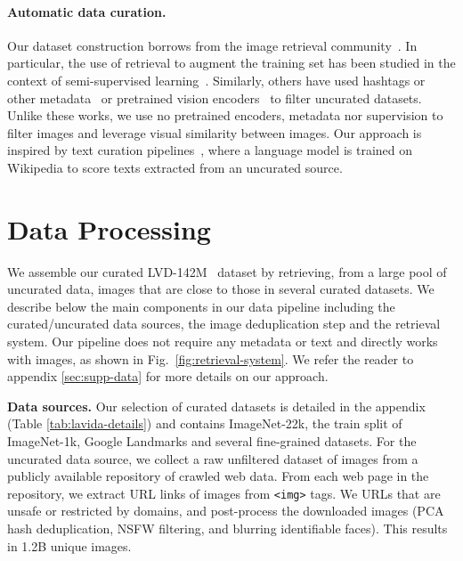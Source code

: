 \paragraph{Automatic data curation.} Our dataset construction borrows from the image retrieval community~\citep{weinzaepfel2021learning,radenovic2018fine,berman2019multigrain,douze2009evaluation,tolias2015particular,revaud2019learning}. In particular, the use of retrieval to augment the training set has been studied in the context of semi-supervised learning~\citep{yalniz2019billion}. Similarly, others have used hashtags or other metadata~\citep{mahajan2018exploring,radford2021learning} or pretrained vision encoders~\citep{schuhmann2021laion, schuhmann2022laion} to filter uncurated datasets. Unlike these works, we use no pretrained encoders, metadata nor supervision to filter images and leverage visual similarity between images. Our approach is inspired by text curation pipelines~\citep{wenzek2019ccnet}, where a language model is trained on Wikipedia to score texts extracted from an uncurated source.

\section{Data Processing} \label{sec:data_processing}
We assemble our curated LVD-142M \ dataset by retrieving, from a large pool of uncurated data, images that are close to those in several curated datasets. We describe below the main components in our data pipeline including the curated/uncurated data sources, the image deduplication step and the retrieval system. Our pipeline does not require any metadata or text and directly works with images, as shown in Fig.~\ref{fig:retrieval-system}. 
We refer the reader to appendix \ref{sec:supp-data} for more details on our approach.

\textbf{Data sources.} Our selection of curated datasets is detailed in the appendix (Table \ref{tab:lavida-details}) and contains ImageNet-22k, the train split of ImageNet-1k, Google Landmarks and several fine-grained datasets. For the uncurated data source, we collect a raw unfiltered dataset of images from a publicly available repository of crawled web data. From each web page in the repository, we extract URL links of images from \texttt{<img>} tags. We  URLs that are unsafe or restricted by domains, and post-process the downloaded images (PCA hash deduplication, NSFW filtering, and blurring identifiable faces). This results in 1.2B unique images.

